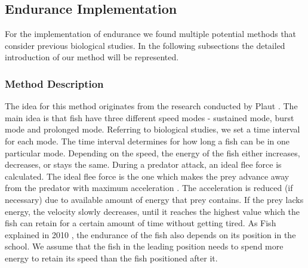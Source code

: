 \documentclass[internal]{FRIreport}
\begin{document}


\subsection{Endurance Implementation}
For the implementation of endurance we found multiple potential methods that consider previous biological studies. In the following subsections the detailed introduction of our method will be represented.


\subsubsection{Method Description}
The idea for this method originates from the research conducted by Plaut \cite{plaut2001critical}. The main idea is that fish have three different speed modes - sustained mode, burst mode and prolonged mode. Referring to biological studies, we set a time interval for each mode. The time interval determines for how long a fish can be in one particular mode. Depending on the speed, the energy of the fish either increases, decreases, or stays the same. During a predator attack, an ideal flee force is calculated. The ideal flee force is the one which makes the prey advance away from the predator with maximum acceleration \cite{lee2013evaluation}. The acceleration is reduced (if necessary) due to available amount of energy that prey contains. If the prey lacks energy, the velocity slowly decreases, until it reaches the highest value which the fish can retain for a certain amount of time without getting tired. As Fish explained in 2010 \cite{fish2010swimming}, the endurance of the fish also depends on its position in the school. We assume that the fish in the leading position needs to spend more energy to retain its speed than the fish positioned after it.
~\\
\end{document}
